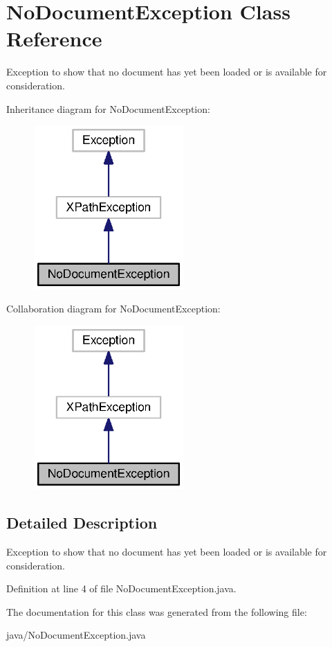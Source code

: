 \section{No\+Document\+Exception Class Reference}
\label{classorg_1_1smallfoot_1_1xpath_1_1NoDocumentException}


Exception to show that no document has yet been loaded or is available for consideration.  




Inheritance diagram for No\+Document\+Exception\+:\nopagebreak
\begin{figure}[H]
\begin{center}
\leavevmode
\includegraphics[width=162pt]{classorg_1_1smallfoot_1_1xpath_1_1NoDocumentException__inherit__graph}
\end{center}
\end{figure}


Collaboration diagram for No\+Document\+Exception\+:\nopagebreak
\begin{figure}[H]
\begin{center}
\leavevmode
\includegraphics[width=162pt]{classorg_1_1smallfoot_1_1xpath_1_1NoDocumentException__coll__graph}
\end{center}
\end{figure}


\subsection{Detailed Description}
Exception to show that no document has yet been loaded or is available for consideration. 

Definition at line 4 of file No\+Document\+Exception.\+java.



The documentation for this class was generated from the following file\+:\begin{DoxyCompactItemize}
\item 
java/No\+Document\+Exception.\+java\end{DoxyCompactItemize}
